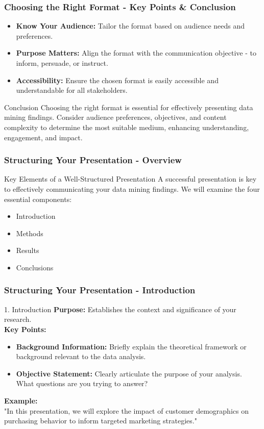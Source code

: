 \documentclass{beamer}
\begin{document}
\begin{frame}[fragile]
    \frametitle{Choosing the Right Format - Key Points \& Conclusion}
    \begin{itemize}
        \item \textbf{Know Your Audience:} Tailor the format based on audience needs and preferences.
        \item \textbf{Purpose Matters:} Align the format with the communication objective - to inform, persuade, or instruct.
        \item \textbf{Accessibility:} Ensure the chosen format is easily accessible and understandable for all stakeholders.
    \end{itemize}
    
    \begin{block}{Conclusion}
    Choosing the right format is essential for effectively presenting data mining findings. Consider audience preferences, objectives, and content complexity to determine the most suitable medium, enhancing understanding, engagement, and impact.
    \end{block}
\end{frame}

\begin{frame}[fragile]
    \frametitle{Structuring Your Presentation - Overview}
    \begin{block}{Key Elements of a Well-Structured Presentation}
        A successful presentation is key to effectively communicating your data mining findings. 
        We will examine the four essential components: 
        \begin{itemize}
            \item Introduction
            \item Methods
            \item Results
            \item Conclusions
        \end{itemize}
    \end{block}
\end{frame}

\begin{frame}[fragile]
    \frametitle{Structuring Your Presentation - Introduction}
    \begin{block}{1. Introduction}
        \textbf{Purpose:} Establishes the context and significance of your research. 
        \\ \textbf{Key Points:}
        \begin{itemize}
            \item \textbf{Background Information:} Briefly explain the theoretical framework or background relevant to the data analysis.
            \item \textbf{Objective Statement:} Clearly articulate the purpose of your analysis. What questions are you trying to answer?
        \end{itemize}
        \textbf{Example:} 
        \\ "In this presentation, we will explore the impact of customer demographics on purchasing behavior to inform targeted marketing strategies."
    \end{block}
\end{frame}
\end{document}
